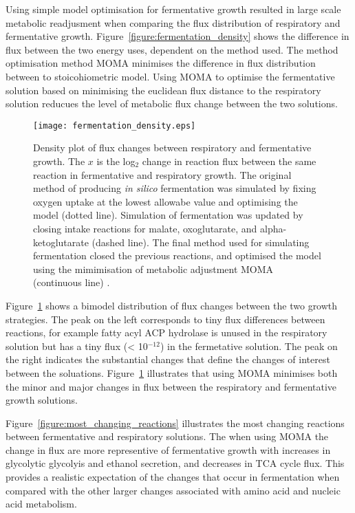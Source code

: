 Using simple model optimisation for fermentative growth resulted in large scale metabolic readjusment when comparing the flux distribution of respiratory and fermentative growth. Figure~\vref{figure:fermentation_density} shows the difference in flux between the two energy uses, dependent on the method used. The method optimisation method MOMA \cite{segre2002} minimises the difference in flux distribution between to stoicohiometric model. Using MOMA to optimise the fermentative solution based on minimising the euclidean flux distance to the respiratory solution reducues the level of metabolic flux change between the two solutions.

\begin{figure}
  \centering
  \texttt{[image: fermentation\_density.eps]}
  \caption[Flux changes between respiratory and fermentative growth]{Density plot of flux changes between respiratory and fermentative growth. The $x$ is the log$_2$ change in reaction flux between the same reaction in fermentative and respiratory growth. The original method of producing \emph{in silico} fermentation was simulated by fixing oxygen uptake at the lowest allowabe value and optimising the model (dotted line). Simulation of fermentation was updated by closing intake reactions for malate, oxoglutarate, and alpha-ketoglutarate (dashed line). The final method used for simulating fermentation closed the previous reactions, and optimised the model using the mimimisation of metabolic adjustment MOMA (continuous line) \cite{segre2002}. } 
  \label{figure:fermentation_density}
\end{figure}

Figure~\ref{figure:fermentation_density} shows a bimodel distribution of flux changes between the two growth strategies. The peak on the left corresponds to tiny flux differences between reactions, for example fatty acyl ACP hydrolase is unused in the respiratory solution but has a tiny flux (< 10$^{-12}$) in the fermetative solution. The peak on the right indicates the substantial changes that define the changes of interest between the soluations. Figure~\ref{figure:fermentation_density} illustrates that using MOMA minimises both the minor and major changes in flux between the respiratory and fermentative growth solutions.

Figure~\vref{figure:most_changing_reactions} illustrates the most changing reactions between fermentative and respiratory solutions. The when using MOMA the change in flux are more representive of fermentative growth with increases in glycolytic glycolyis and ethanol secretion, and decreases in TCA cycle flux. This provides a realistic expectation of the changes that occur in fermentation when compared with the other larger changes associated with amino acid and nucleic acid metabolism.

